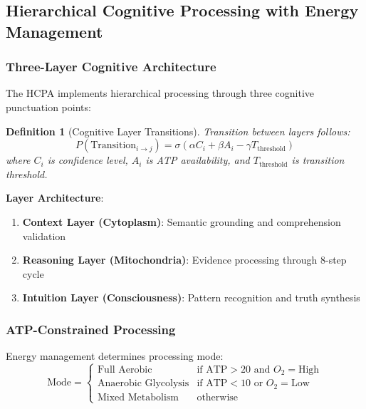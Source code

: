 \documentclass[12pt,a4paper]{article}
\newtheorem{definition}{Definition}
\begin{document}
\subsection{Hierarchical Cognitive Processing with Energy Management}

\subsubsection{Three-Layer Cognitive Architecture}

The HCPA implements hierarchical processing through three cognitive punctuation points:

\begin{definition}[Cognitive Layer Transitions]
Transition between layers follows:
\begin{equation}
P(\text{Transition}_{i \rightarrow j}) = \sigma\left(\alpha C_i + \beta A_i - \gamma T_{\text{threshold}}\right)
\end{equation}
where $C_i$ is confidence level, $A_i$ is ATP availability, and $T_{\text{threshold}}$ is transition threshold.
\end{definition}

\textbf{Layer Architecture}:
\begin{enumerate}
\item \textbf{Context Layer (Cytoplasm)}: Semantic grounding and comprehension validation
\item \textbf{Reasoning Layer (Mitochondria)}: Evidence processing through 8-step cycle
\item \textbf{Intuition Layer (Consciousness)}: Pattern recognition and truth synthesis
\end{enumerate}

\subsubsection{ATP-Constrained Processing}

Energy management determines processing mode:
\begin{equation}
\text{Mode} = \begin{cases}
\text{Full Aerobic} & \text{if } \text{ATP} > 20 \text{ and } O_2 = \text{High} \\
\text{Anaerobic Glycolysis} & \text{if } \text{ATP} < 10 \text{ or } O_2 = \text{Low} \\
\text{Mixed Metabolism} & \text{otherwise}
\end{cases}
\end{equation}
\end{document}
